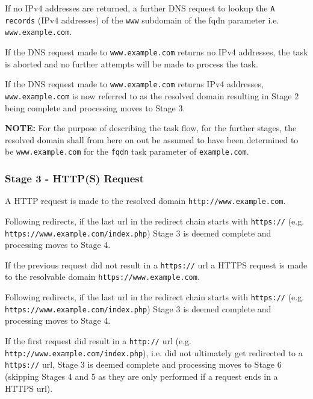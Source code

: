 \documentclass{mscreport}
\begin{document}
\vspace{0.3cm} \noindent
If no IPv4 addresses are returned, a further DNS request to lookup the \texttt{A records} (IPv4 addresses) of the \texttt{www} subdomain of the fqdn parameter i.e. \texttt{www.example.com}.

\vspace{0.3cm} \noindent
If the DNS request made to \texttt{www.example.com} returns no IPv4 addresses, the task is aborted and no further attempts will be made to process the task.

\vspace{0.3cm} \noindent
If the DNS request made to \texttt{www.example.com} returns IPv4 addresses, \texttt{www.example.com} is now referred to as the resolved domain resulting in Stage 2 being complete and processing moves to Stage 3.

\vspace{0.3cm} \noindent
\textbf{NOTE:} For the purpose of describing the task flow, for the further stages, the resolved domain shall from here on out be assumed to have been determined to be \texttt{www.example.com} for the \texttt{fqdn} task parameter of \texttt{example.com}.

\subsubsection{Stage 3 - HTTP(S) Request}

A HTTP request is made to the resolved domain \texttt{http://www.example.com}.

\vspace{0.3cm} \noindent
Following redirects, if the last url in the redirect chain starts with \newline \texttt{https://} (e.g. \texttt{https://www.example.com/index.php}) Stage 3 is deemed complete and processing moves to Stage 4.

\vspace{0.3cm} \noindent
If the previous request did not result in a \texttt{https://} url a HTTPS request is made to the resolvable domain \texttt{https://www.example.com}.

\vspace{0.3cm} \noindent
Following redirects, if the last url in the redirect chain starts with \texttt{https://} (e.g. \newline \texttt{https://www.example.com/index.php}) Stage 3 is deemed complete and processing moves to Stage 4.

\vspace{0.3cm} \noindent
If the first request did result in a \texttt{http://} url (e.g. \texttt{http://www.example.com/index.php}), i.e. did not ultimately get redirected to a \texttt{https://} url, Stage 3 is deemed complete and processing moves to Stage 6 (skipping Stages 4 and 5 as they are only performed if a request ends in a HTTPS url).
\end{document}
